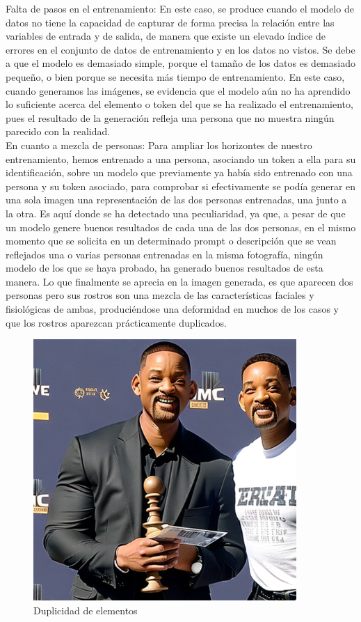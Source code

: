 Falta de pasos en el entrenamiento: En este caso, se produce cuando el modelo de datos no tiene la capacidad de capturar de forma precisa la relación entre las variables de entrada y de salida, de manera que existe un elevado índice de errores en el conjunto de datos de entrenamiento y en los datos no vistos. Se debe a que el modelo es demasiado simple, porque el tamaño de los datos es demasiado pequeño, o bien porque se necesita más tiempo de entrenamiento. En este caso, cuando generamos las imágenes, se evidencia que el modelo aún no ha aprendido lo suficiente acerca del elemento o token del que se ha realizado el entrenamiento, pues el resultado de la generación refleja una persona que no muestra ningún parecido con la realidad.\\

En cuanto a mezcla de personas: Para ampliar los horizontes de nuestro entrenamiento, hemos entrenado a una persona, asociando un token a ella para su identificación, sobre un modelo que previamente ya había sido entrenado con una persona y su token asociado, para comprobar si efectivamente se podía generar en una sola imagen una representación de las dos personas entrenadas, una junto a la otra. Es aquí donde se ha detectado una peculiaridad, ya que, a pesar de que un modelo genere buenos resultados de cada una de las dos personas, en el mismo momento que se solicita en un determinado prompt o descripción que se vean reflejados una o varias personas entrenadas en la misma fotografía, ningún modelo de los que se haya probado, ha generado buenos resultados de esta manera. Lo que finalmente se aprecia en la imagen generada, es que aparecen dos personas pero sus rostros son una mezcla de las características faciales y fisiológicas de ambas, produciéndose una deformidad en muchos de los casos y que los rostros aparezcan prácticamente duplicados.
\begin{figure}[h]
	\centering
	\includegraphics[width = 0.8
	\textwidth]{Imagenes/Vectorial/duplicidad_will.png}
		\caption{Duplicidad de elementos}
	\label{fig:willpor2}
\end{figure}





